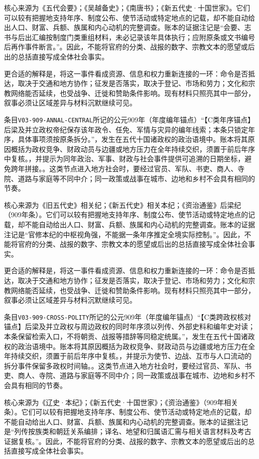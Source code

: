 核心来源为《五代会要》；《吴越备史》；《南唐书》；《新五代史·十国世家》。它们可以较有把握地支持年序、制度公布、使节活动或特定地点的记载，却不能自动给出人口、财富、兵额、族属和内心动机的完整调查。账本的证据注记是“会要、志书与后出汇编按制度门类重组材料，未必记录该年具体执行；应附原条或文书编号后再作事件断言。”。因此，不能将官府的分类、战报的数字、宗教文本的愿望或后出的总括直接写成全体社会事实。

更合适的解释是，将这一事件看成资源、信息和权力重新连接的一环：命令是否抵达，取决于交通和地方协作；征发是否落实，取决于登记、市场和劳力；文化和宗教网络能否延续，也受战争、迁徙和赞助条件影响。现有材料只照亮其中一部分，叙事必须让区域差异与材料沉默继续可见。

条目\texttt{V03-909-ANNAL-CENTRAL}所记的公元909年（年度编年锚点）“【C类年序锚点】后梁及并立政权帝纪保存该年政令、任免、军情与灾异的编年线索；本条只锁定年序，具体事项须按原条拆分。”，发生在五代十国诸政权的政治语境中。账本将其原因概括为政权竞争、财政动员与边疆或地方压力在全年持续交织，须置于前后年序中复核。，并提示为同年政治、军事、财政与社会事件提供可追溯的日期坐标，避免跨年拼接。。这类节点进入地方社会时，要经过官员、军队、书吏、商人、寺院、道路与家庭等不同中介；同一政策或战事在城市、边地和乡村不会具有相同的节奏。

核心来源为《旧五代史》相关纪；《新五代史》相关本纪；《资治通鉴》后梁纪（909年条）。它们可以较有把握地支持年序、制度公布、使节活动或特定地点的记载，却不能自动给出人口、财富、兵额、族属和内心动机的完整调查。账本的证据注记是“官修本纪的中枢视角强，不能据一条年序推定全境实际控制。”。因此，不能将官府的分类、战报的数字、宗教文本的愿望或后出的总括直接写成全体社会事实。

更合适的解释是，将这一事件看成资源、信息和权力重新连接的一环：命令是否抵达，取决于交通和地方协作；征发是否落实，取决于登记、市场和劳力；文化和宗教网络能否延续，也受战争、迁徙和赞助条件影响。现有材料只照亮其中一部分，叙事必须让区域差异与材料沉默继续可见。

条目\texttt{V03-909-CROSS-POLITY}所记的公元909年（年度编年锚点）“【C类跨政权核对锚点】后梁及并立政权与周边政权的同时年序须以列传、外部史料和编年史对读；本条保留检索入口，不将朝贡、战报等措辞等同稳定统属。”，发生在五代十国诸政权的政治语境中。账本将其原因概括为政权竞争、财政动员与边疆或地方压力在全年持续交织，须置于前后年序中复核。，并提示为使节、边战、互市与人口流动的拆分事件保留多政权时间轴。。这类节点进入地方社会时，要经过官员、军队、书吏、商人、寺院、道路与家庭等不同中介；同一政策或战事在城市、边地和乡村不会具有相同的节奏。

核心来源为《辽史·本纪》；《新五代史·十国世家》；《资治通鉴》（909年相关条）。它们可以较有把握地支持年序、制度公布、使节活动或特定地点的记载，却不能自动给出人口、财富、兵额、族属和内心动机的完整调查。账本的证据注记是“列传按族类和朝廷关系编排；译名、地望和归属语汇需与相关语言材料及考古证据复核。”。因此，不能将官府的分类、战报的数字、宗教文本的愿望或后出的总括直接写成全体社会事实。

